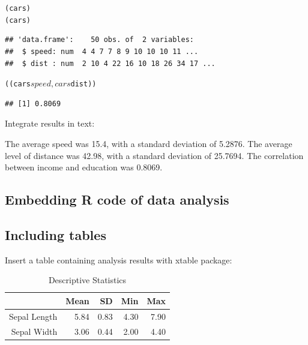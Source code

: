 \documentclass[man]{apa6}\usepackage{knitr}
\begin{document}
\begin{knitrout}
\color{fgcolor}\begin{kframe}
\begin{alltt}
(cars)  
(cars)  
\end{alltt}
\begin{verbatim}
## 'data.frame':	50 obs. of  2 variables:
##  $ speed: num  4 4 7 7 8 9 10 10 10 11 ...
##  $ dist : num  2 10 4 22 16 10 18 26 34 17 ...
\end{verbatim}
\begin{alltt}
((cars$speed, cars$dist))  
\end{alltt}
\begin{verbatim}
## [1] 0.8069
\end{verbatim}
\end{kframe}
\end{knitrout}


Integrate results in text:

The average speed was 15.4, with a standard deviation of 5.2876. The average level of distance was 42.98, with a standard deviation of 25.7694. The correlation between income and education was 0.8069.

\subsection{Embedding R code of data analysis}

\subsection{Including tables}

Insert a table containing analysis results with xtable package:

\begin{table}[!htb]
\begin{center}
\caption{Descriptive Statistics}
\label{tab:descriptive}
\begin{tabular}{rrrrr}
  \hline
 & Mean & SD & Min & Max \\ 
  \hline
Sepal Length & 5.84 & 0.83 & 4.30 & 7.90 \\ 
  Sepal Width & 3.06 & 0.44 & 2.00 & 4.40 \\ 
   \hline
\end{tabular}
\end{center}
\end{table}
\end{document}
